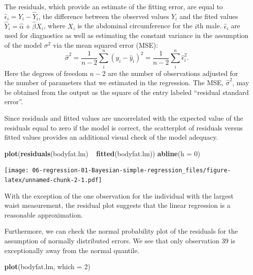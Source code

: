 \documentclass[]{book}
\newenvironment{Shaded}{\begin{snugshade}}{\end{snugshade}}
\newcommand{\KeywordTok}[1]{\textcolor[rgb]{0.13,0.29,0.53}{\textbf{{#1}}}}
\newcommand{\DataTypeTok}[1]{\textcolor[rgb]{0.13,0.29,0.53}{{#1}}}
\newcommand{\DecValTok}[1]{\textcolor[rgb]{0.00,0.00,0.81}{{#1}}}
\newcommand{\StringTok}[1]{\textcolor[rgb]{0.31,0.60,0.02}{{#1}}}
\newcommand{\NormalTok}[1]{{#1}}
\theoremstyle{definition}
\theoremstyle{definition}
\theoremstyle{definition}
\theoremstyle{remark}
\begin{document}
The residuals, which provide an estimate of the fitting error, are equal
to \(\hat{\epsilon}_i = Y_i - \hat{Y}_i\), the difference between the
observed values \(Y_i\) and the fited values
\(\hat{Y}_i = \hat{\alpha} + \hat{\beta}X_i\), where \(X_i\) is the
abdominal circumference for the \(i\)th male. \(\hat{\epsilon}_i\) are
used for diagnostics as well as estimating the constant variance in the
assumption of the model \(\sigma^2\) via the mean squared error (MSE):
\[ \hat{\sigma}^2 = \frac{1}{n-2}\sum_i^n (y_i-\hat{y}_i)^2 = \frac{1}{n-2}\sum_i^n \hat{\epsilon}_i^2. \]
Here the degrees of freedom \(n-2\) are the number of observations
adjusted for the number of parameters that we estimated in the
regression. The MSE, \(\hat{\sigma}^2\), may be obtained from the output
as the square of the entry labeled ``residual standard error''.

Since residuals and fitted values are uncorrelated with the expected
value of the residuals equal to zero if the model is correct, the
scatterplot of residuals versus fitted values provides an additional
visual check of the model adequacy.

\begin{Shaded}
\begin{Highlighting}[]
\KeywordTok{plot}\NormalTok{(}\KeywordTok{residuals}\NormalTok{(bodyfat.lm) ~}\StringTok{ }\KeywordTok{fitted}\NormalTok{(bodyfat.lm))}
\KeywordTok{abline}\NormalTok{(}\DataTypeTok{h =} \DecValTok{0}\NormalTok{)}
\end{Highlighting}
\end{Shaded}

\texttt{[image: 06-regression-01-Bayesian-simple-regression\_files/figure-latex/unnamed-chunk-2-1.pdf]}

With the exception of the one observation for the individual with the
largest waist measurement, the residual plot suggests that the linear
regression is a reasonable approximation.

Furthermore, we can check the normal probability plot of the residuals
for the assumption of normally distributed errors. We see that only
observation 39 is exceptionally away from the normal quantile.

\begin{Shaded}
\begin{Highlighting}[]
\KeywordTok{plot}\NormalTok{(bodyfat.lm, }\DataTypeTok{which =} \DecValTok{2}\NormalTok{)}
\end{Highlighting}
\end{Shaded}
\end{document}
